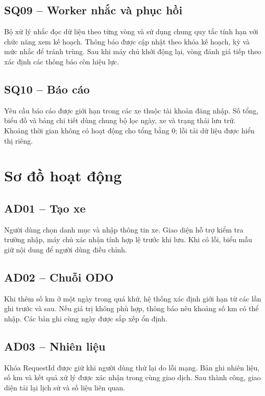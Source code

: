 \subsection{SQ09 -- Worker nhắc và phục hồi}
Bộ xử lý nhắc đọc dữ liệu theo từng vòng và sử dụng chung quy tắc tính hạn với chức năng xem kế hoạch. Thông báo được cập nhật theo khóa kế hoạch, kỳ và mức nhắc để tránh trùng. Sau khi máy chủ khởi động lại, vòng đánh giá tiếp theo xác định các thông báo còn hiệu lực.

\subsection{SQ10 -- Báo cáo}
Yêu cầu báo cáo được giới hạn trong các xe thuộc tài khoản đăng nhập. Số tổng, biểu đồ và bảng chi tiết dùng chung bộ lọc ngày, xe và trạng thái lưu trữ. Khoảng thời gian không có hoạt động cho tổng bằng 0; lỗi tải dữ liệu được hiển thị riêng.

\section{Sơ đồ hoạt động}
\subsection{AD01 -- Tạo xe}
Người dùng chọn danh mục và nhập thông tin xe. Giao diện hỗ trợ kiểm tra trường nhập, máy chủ xác nhận tính hợp lệ trước khi lưu. Khi có lỗi, biểu mẫu giữ nội dung để người dùng điều chỉnh.

\subsection{AD02 -- Chuỗi ODO}
Khi thêm số km ở một ngày trong quá khứ, hệ thống xác định giới hạn từ các lần ghi trước và sau. Nếu giá trị không phù hợp, thông báo nêu khoảng số km có thể nhập. Các bản ghi cùng ngày được sắp xếp ổn định.

\subsection{AD03 -- Nhiên liệu}
Khóa RequestId được giữ khi người dùng thử lại do lỗi mạng. Bản ghi nhiên liệu, số km và kết quả xử lý được xác nhận trong cùng giao dịch. Sau thành công, giao diện tải lại lịch sử và số liệu liên quan.

